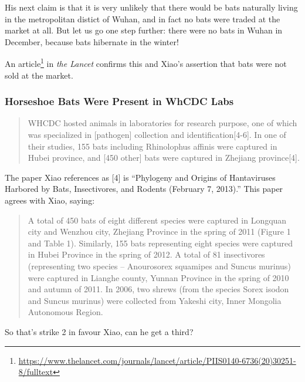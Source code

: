 \documentclass[11pt]{article}
\begin{document}
His next claim is that it is very unlikely that there would be bats naturally living in the metropolitan distict of Wuhan, and in fact no bats were traded at the market at all. But let us go one step further: there were no bats in Wuhan in December, because bats hibernate in the winter!

An article\footnote{\url{https://www.thelancet.com/journals/lancet/article/PIIS0140-6736(20)30251-8/fulltext}} in \emph{the Lancet} confirms this and Xiao's assertion that bats were not sold at the market.

\subsubsection{Horseshoe Bats Were Present in WhCDC Labs}
\label{sec:org9fdf60a}
\begin{quote}
WHCDC hosted animals in laboratories for research purpose, one of which was specialized in [pathogen] collection and identification[4-6]. In one of their studies, 155 bats including Rhinolophus affinis were captured in Hubei province, and [450 other] bats were captured in Zhejiang province[4].
\end{quote}

The paper Xiao references as [4] is ``Phylogeny and Origins of Hantaviruses Harbored by Bats, Insectivores, and Rodents (February 7, 2013).'' This paper agrees with Xiao, saying:
\begin{quote}
A total of 450 bats of eight different species were captured in Longquan city and Wenzhou city, Zhejiang Province in the spring of 2011 (Figure 1 and Table 1). Similarly, 155 bats representing eight species were captured in Hubei Province in the spring of 2012. A total of 81 insectivores (representing two species – Anourosorex squamipes and Suncus murinus) were captured in Lianghe county, Yunnan Province in the spring of 2010 and autumn of 2011. In 2006, two shrews (from the species Sorex isodon and Suncus murinus) were collected from Yakeshi city, Inner Mongolia Autonomous Region.
\end{quote}

So that's strike 2 in favour Xiao, can he get a third?
\end{document}
